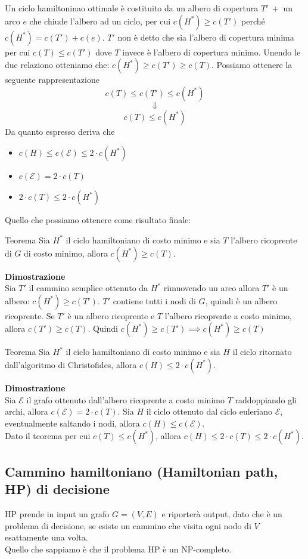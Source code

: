 Un ciclo hamiltoninao ottimale è costituito da un albero di copertura $T' \ +$ un arco $e$ che chiude l'albero ad un ciclo, per cui  $c(H^*) \geq c(T')$ perché $c(H^*) = c(T') + c(e)$.
$T'$ non è detto che sia l'albero di copertura minima per cui $c(T) \leq c(T')$ dove $T$ invece è l'albero di copertura minimo. Unendo le due relaziono otteniamo che: $c(H^*) \geq c(T') \geq c(T)$.
Possiamo ottenere la seguente rappresentazione 
\[c(T) \leq c(T') \leq c(H^*)\]
\[\Downarrow\]
\[c(T) \leq c(H^*)\]
Da quanto espresso deriva che 
\begin{itemize}
    \item $c(H) \leq c(\mathcal{E}) \leq 2 \cdot c(H^*)$
    \item $c(\mathcal{E}) = 2 \cdot c(T)$
    \item $2 \cdot c(T) \leq 2 \cdot c(H^*)$
\end{itemize}
Quello che possiamo ottenere come risultato finale:

\begin{teorema}{Teorema}{}
Sia $H^*$ il ciclo hamiltoniano di costo minimo e sia $T$ l’albero ricoprente di $G$ di costo minimo, allora $c(H^*) \geq c(T)$.
\end{teorema}
\textbf{Dimostrazione}\\
Sia $T'$ il cammino semplice ottenuto da $H^*$ rimuovendo un arco allora $T'$ è un albero: $c(H^*) \geq c(T')$.
$T'$ contiene tutti i nodi di $G$, quindi è un albero ricoprente.
Se $T'$ è un albero ricoprente e $T$ l’albero ricoprente a costo minimo, allora $c(T') \geq c(T)$.
Quindi $c(H^*) \geq c(T') \implies c(H^*) \geq c(T)$

\begin{teorema}{Teorema}{}
Sia $H^*$ il ciclo hamiltoniano di costo minimo e sia $H$ il ciclo ritornato dall’algoritmo di Christofides, allora $c(H) \leq 2 \cdot c(H^*)$.
\end{teorema}
\textbf{Dimostrazione}\\
Sia $\mathcal{E}$ il grafo ottenuto dall’albero ricoprente a costo minimo $T$ raddoppiando gli archi, allora $c(\mathcal{E}) = 2 \cdot c(T)$.
Sia $H$ il ciclo ottenuto dal ciclo euleriano $\mathcal{E}$, eventualmente saltando i nodi, allora $c(H) \leq c(\mathcal{E})$.\\
Dato il teorema per cui $c(T) \leq c(H^*)$, allora $c(H) \leq 2 \cdot c(T) \leq 2 \cdot c(H^*)$.

\subsection{Cammino hamiltoniano (Hamiltonian path, HP) di decisione}
HP prende in input un grafo $G=(V,E)$ e riporterà output, dato che è un problema di decisione, se esiste un cammino che visita ogni nodo di $V$ esattamente una volta.\\
Quello che sappiamo è che il problema HP è un NP-completo.

